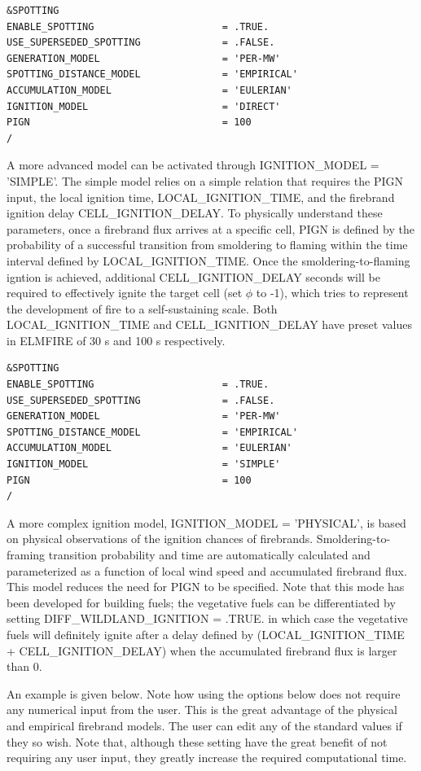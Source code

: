 \begin{verbatim}
&SPOTTING
ENABLE_SPOTTING 					 = .TRUE.
USE_SUPERSEDED_SPOTTING 			 = .FALSE.
GENERATION_MODEL                     = 'PER-MW'
SPOTTING_DISTANCE_MODEL              = 'EMPIRICAL'
ACCUMULATION_MODEL                   = 'EULERIAN'
IGNITION_MODEL                       = 'DIRECT' 
PIGN                                 = 100
/
\end{verbatim}

A more advanced model can be activated through IGNITION\_MODEL = 'SIMPLE'. The simple model relies on a simple relation that requires the PIGN input, the local ignition time, LOCAL\_IGNITION\_TIME, and the firebrand ignition delay CELL\_IGNITION\_DELAY. To physically understand these parameters, once a firebrand flux arrives at a specific cell, PIGN is defined by the probability of a successful transition from smoldering to flaming within the time interval defined by LOCAL\_IGNITION\_TIME. Once the smoldering-to-flaming igntion is achieved, additional CELL\_IGNITION\_DELAY seconds will be required to effectively ignite the target cell (set $\phi$ to -1), which tries to represent the development of fire to a self-sustaining scale. Both LOCAL\_IGNITION\_TIME and CELL\_IGNITION\_DELAY have preset values in ELMFIRE of 30 s and 100 s respectively.

\begin{verbatim}
&SPOTTING
ENABLE_SPOTTING 					 = .TRUE.
USE_SUPERSEDED_SPOTTING 			 = .FALSE.
GENERATION_MODEL                     = 'PER-MW'
SPOTTING_DISTANCE_MODEL              = 'EMPIRICAL'
ACCUMULATION_MODEL                   = 'EULERIAN'
IGNITION_MODEL                       = 'SIMPLE' 
PIGN                                 = 100
/
\end{verbatim}

A more complex ignition model, IGNITION\_MODEL = 'PHYSICAL', is based on physical observations of the ignition chances of firebrands. Smoldering-to-framing transition probability and time are automatically calculated and parameterized as a function of local wind speed and accumulated firebrand flux. This model reduces the need for PIGN to be specified. Note that this mode has been developed for building fuels; the vegetative fuels can be differentiated by setting DIFF\_WILDLAND\_IGNITION = .TRUE. in which case the vegetative fuels will definitely ignite after a delay defined by (LOCAL\_IGNITION\_TIME + CELL\_IGNITION\_DELAY) when the accumulated firebrand flux is larger than 0.

An example is given below. Note how using the options below does not require any numerical input from the user. This is the great advantage of the physical and empirical firebrand models. The user can edit any of the standard values if they so wish. Note that, although these setting have the great benefit of not requiring any user input, they greatly increase the required computational time. 

